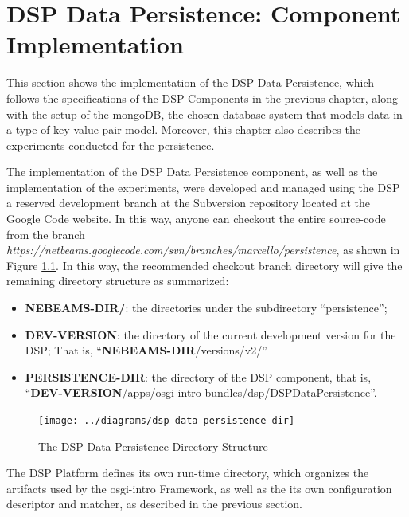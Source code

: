 

\chapter{DSP Data Persistence: Component Implementation}

This section shows the implementation of the DSP Data Persistence, which
follows the specifications of the DSP Components in the previous chapter,
along with the setup of the mongoDB, the chosen database system that models
data in a type of key-value pair model. Moreover, this chapter also describes
the experiments conducted for the persistence.

The implementation of the DSP Data Persistence component, as well as the
implementation of the experiments, were developed and managed using the DSP a
reserved development branch at the Subversion \cite{subversion} repository
located at the Google Code website. In this way, anyone can checkout the entire
source-code from the branch
\textit{https://netbeams.googlecode.com/svn/branches/marcello/persistence},
as shown in Figure \ref{fig:dsp-data-persistence-dir}. In this way, the
recommended checkout branch directory will give the remaining directory
structure as summarized:

\begin{itemize}
  \item \textbf{NEBEAMS-DIR/}: the directories under the subdirectory
  ``persistence'';
  \item \textbf{DEV-VERSION}: the directory of the current development
  version for the DSP; That is, ``\textbf{NEBEAMS-DIR}/versions/v2/''
  \item \textbf{PERSISTENCE-DIR}: the directory of the DSP component, that is,
  ``\textbf{DEV-VERSION}/apps/osgi-intro-bundles/dsp/DSPDataPersistence''.
\end{itemize}

\begin{figure}[!b]
  \centering
  \texttt{[image: ../diagrams/dsp-data-persistence-dir]}
  \caption{The DSP Data Persistence Directory Structure}
  \label{fig:dsp-data-persistence-dir}
\end{figure}

The DSP Platform defines its own run-time directory, which organizes the
artifacts used by the osgi-intro Framework, as well as the its own configuration
descriptor and matcher, as described in the previous section. 

